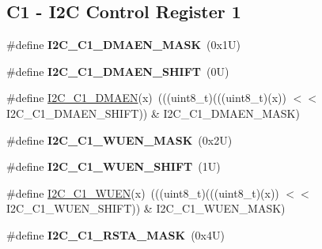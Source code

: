 \subsection*{C1 -\/ I2C Control Register 1}
\begin{DoxyCompactItemize}
\item 
\mbox{\label{group___i2_c___register___masks_gadfd8fccdd35a4944a1e53ffa26e5d06b}} 
\#define {\bfseries I2\+C\+\_\+\+C1\+\_\+\+D\+M\+A\+E\+N\+\_\+\+M\+A\+SK}~(0x1\+U)
\item 
\mbox{\label{group___i2_c___register___masks_ga1cd5f87cc18a56d293697f0463e2a9e3}} 
\#define {\bfseries I2\+C\+\_\+\+C1\+\_\+\+D\+M\+A\+E\+N\+\_\+\+S\+H\+I\+FT}~(0\+U)
\item 
\#define \mbox{\hyperlink{group___i2_c___register___masks_gae8283d400fa6719b68eabf9129d5cec7}{I2\+C\+\_\+\+C1\+\_\+\+D\+M\+A\+EN}}(x)~(((uint8\+\_\+t)(((uint8\+\_\+t)(x)) $<$$<$ I2\+C\+\_\+\+C1\+\_\+\+D\+M\+A\+E\+N\+\_\+\+S\+H\+I\+FT)) \& I2\+C\+\_\+\+C1\+\_\+\+D\+M\+A\+E\+N\+\_\+\+M\+A\+SK)
\item 
\mbox{\label{group___i2_c___register___masks_ga708d3eded28946d6f2e4b7ed5aff8fe8}} 
\#define {\bfseries I2\+C\+\_\+\+C1\+\_\+\+W\+U\+E\+N\+\_\+\+M\+A\+SK}~(0x2\+U)
\item 
\mbox{\label{group___i2_c___register___masks_gad1bec740751b47fd0f4e02d913c3b287}} 
\#define {\bfseries I2\+C\+\_\+\+C1\+\_\+\+W\+U\+E\+N\+\_\+\+S\+H\+I\+FT}~(1\+U)
\item 
\#define \mbox{\hyperlink{group___i2_c___register___masks_ga171df40460d773ec95fa8963897b51d3}{I2\+C\+\_\+\+C1\+\_\+\+W\+U\+EN}}(x)~(((uint8\+\_\+t)(((uint8\+\_\+t)(x)) $<$$<$ I2\+C\+\_\+\+C1\+\_\+\+W\+U\+E\+N\+\_\+\+S\+H\+I\+FT)) \& I2\+C\+\_\+\+C1\+\_\+\+W\+U\+E\+N\+\_\+\+M\+A\+SK)
\item 
\mbox{\label{group___i2_c___register___masks_ga656f6747e8edc8299767365ea1ac9d70}} 
\#define {\bfseries I2\+C\+\_\+\+C1\+\_\+\+R\+S\+T\+A\+\_\+\+M\+A\+SK}~(0x4\+U)
\item 
\mbox{\label{group___i2_c___register___masks_gac6c61e0bd2615da3bbc3079984192dd7}} 

\end{DoxyCompactItemize}

